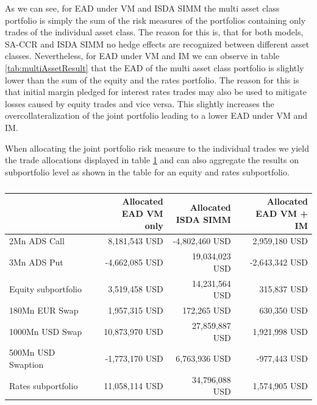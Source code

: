 \documentclass[../Thesis_AHoecherl.tex]{subfiles}
\begin{document}
    As we can see, for EAD under \gls{VM} and \gls{ISDA SIMM} the multi asset class portfolio is simply the sum of the risk measures of the portfolios containing only trades of the individual asset class.
    The reason for this is, that for both models, \gls{SA-CCR} and \gls{ISDA SIMM} no hedge effects are recognized between different asset classes.
    Nevertheless, for EAD under VM and IM we can observe in table \ref{tab:multiAssetResult} that the EAD of the multi asset class portfolio is slightly lower than the sum of the equity and the rates portfolio. 
    The reason for this is that initial margin pledged for interest rates trades may also be used to mitigate losses caused by equity trades and vice versa. This slightly increases the overcollateralization of the joint portfolio leading to a lower EAD under VM and IM.

    When allocating the joint portfolio risk measure to the individual trades we yield the trade allocations displayed in table \ref{tab:multiAssetAllocation} and can also aggregate the results on subportfolio level as shown in the table for an equity and rates subportfolio.

    \begin{table}[htbp]
        \centering
        \begin{tabular}{l||r|r|r}
                & \makecell{Allocated \\ EAD VM only} &\makecell{Allocated \\ \gls{ISDA SIMM}} & \makecell{Allocated \\\gls{EAD} \gls{VM} + \gls{IM}} \\
                \toprule
        2Mn ADS Call & 8,181,543 USD & -4,802,460 USD & 2,959,180 USD \\
        3Mn ADS Put & -4,662,085 USD & 19,034,023 USD & -2,643,342 USD \\
        \midrule
        Equity subportfolio & 3,519,458 USD & 14,231,564 USD & 315,837 USD \\
        \toprule
        180Mn EUR Swap & 1,957,315 USD & 172,265 USD & 630,350 USD \\
        1000Mn USD Swap & 10,873,970 USD & 27,859,887 USD & 1,921,998 USD \\
        500Mn USD Swaption & -1,773,170 USD & 6,763,936 USD & -977,443 USD \\
        \midrule
        Rates subportfolio & 11,058,114 USD & 34,796,088 USD & 1,574,905 USD \\
        \end{tabular}%
        \caption{}
        \label{tab:multiAssetAllocation}%
    \end{table}%
\end{document}
